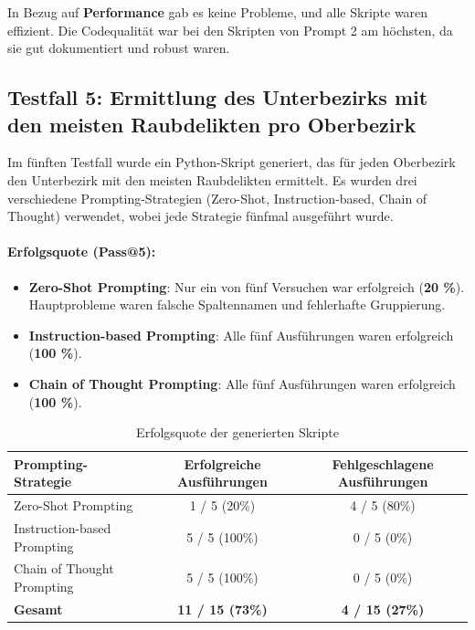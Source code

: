 \documentclass[11pt,a4paper]{article}
\begin{document}
In Bezug auf \textbf{Performance} gab es keine Probleme, und alle Skripte waren effizient. Die Codequalität war bei den Skripten von Prompt 2 am höchsten, da sie gut dokumentiert und robust waren.

\subsection{Testfall 5: Ermittlung des Unterbezirks mit den meisten Raubdelikten pro Oberbezirk}

Im fünften Testfall wurde ein Python-Skript generiert, das für jeden Oberbezirk den Unterbezirk mit den meisten Raubdelikten ermittelt. Es wurden drei verschiedene Prompting-Strategien (Zero-Shot, Instruction-based, Chain of Thought) verwendet, wobei jede Strategie fünfmal ausgeführt wurde.

\paragraph{Erfolgsquote (Pass@5):}
\begin{itemize}
    \item \textbf{Zero-Shot Prompting}: Nur ein von fünf Versuchen war erfolgreich (\textbf{20 \%}). Hauptprobleme waren falsche Spaltennamen und fehlerhafte Gruppierung.
    \item \textbf{Instruction-based Prompting}: Alle fünf Ausführungen waren erfolgreich (\textbf{100 \%}).
    \item \textbf{Chain of Thought Prompting}: Alle fünf Ausführungen waren erfolgreich (\textbf{100 \%}).
\end{itemize}

\begin{table}[h]
    \centering
    \caption{Erfolgsquote der generierten Skripte}
    \label{tab:testcase5_ergebnisse}
    \begin{tabular}{|l|c|c|}
        \hline
        \textbf{Prompting-Strategie} & \textbf{Erfolgreiche Ausführungen} & \textbf{Fehlgeschlagene Ausführungen} \\
        \hline
        Zero-Shot Prompting    & 1 / 5 (20\%) & 4 / 5 (80\%) \\
        Instruction-based Prompting  & 5 / 5 (100\%) & 0 / 5 (0\%) \\
        Chain of Thought Prompting  & 5 / 5 (100\%) & 0 / 5 (0\%) \\
        \hline
        \textbf{Gesamt} & \textbf{11 / 15 (73\%)} & \textbf{4 / 15 (27\%)} \\
        \hline
    \end{tabular}
\end{table}
\end{document}
